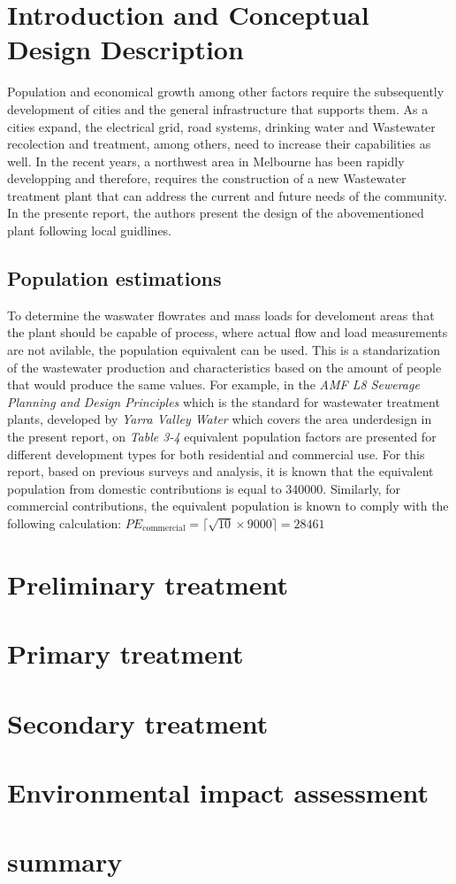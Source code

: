 \documentclass[12pt]{article}
\begin{document}
\section{Introduction and Conceptual Design Description}
Population and economical growth among other factors require the subsequently development of cities and the
general infrastructure that supports them. As a cities expand, the electrical grid, road systems, drinking water and Wastewater
recolection and treatment, among others, need to increase their capabilities as well. In the recent years, a northwest area in
Melbourne has been rapidly developping and therefore, requires the construction of a new Wastewater treatment plant that can 
address the current and future needs of the community. In the presente report, the authors present the design of the abovementioned
plant following local guidlines.

\subsection{Population estimations}

To determine the waswater flowrates and mass loads for develoment areas that the plant should be capable of process, 
where actual flow and load
measurements are not avilable, the population equivalent can be used. This is a standarization of the wastewater production
and characteristics based on the amount of people that would produce the same values. For example, in the
\textit{AMF L8 Sewerage Planning and Design Principles}
 which is the standard for wastewater treatment plants, developed by 
 \textit{Yarra Valley Water}
  which covers the area underdesign in the present report, on 
\textit{Table 3-4}
 equivalent population factors are presented for different development types for both residential and commercial use. 
For this report, based on previous surveys and analysis, it is known that the equivalent population from 
domestic contributions is equal to 340000.
Similarly, for commercial contributions, the equivalent population is known to comply with the 
following calculation: 
\(PE_{\mathrm{commercial}}
= \bigl\lceil \sqrt{\text{10}}\times 9000 \bigr\rceil
=  \text{28461} \)


\newpage

\section{Preliminary treatment}
\newpage

\section{Primary treatment}
\newpage

\section{Secondary treatment}
\newpage

\section{Environmental impact assessment}
\newpage

\section{summary}
\newpage
\end{document}
